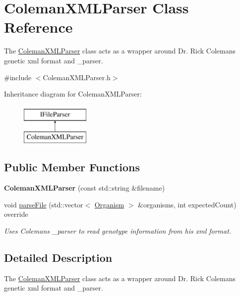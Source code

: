 \hypertarget{class_coleman_x_m_l_parser}{}\section{Coleman\+X\+M\+L\+Parser Class Reference}
\label{class_coleman_x_m_l_parser}


The \hyperlink{class_coleman_x_m_l_parser}{Coleman\+X\+M\+L\+Parser} class acts as a wrapper around Dr. Rick Coleman\textquotesingle{}s genetic xml format and \+\_\+parser.  




{\ttfamily \#include $<$Coleman\+X\+M\+L\+Parser.\+h$>$}

Inheritance diagram for Coleman\+X\+M\+L\+Parser\+:\begin{figure}[H]
\begin{center}
\leavevmode
\includegraphics[height=2.000000cm]{class_coleman_x_m_l_parser}
\end{center}
\end{figure}
\subsection*{Public Member Functions}
\begin{DoxyCompactItemize}
\item 
{\bfseries Coleman\+X\+M\+L\+Parser} (const std\+::string \&filename)\hypertarget{class_coleman_x_m_l_parser_a3daa7719b45ab65f0b022c869055f104}{}\label{class_coleman_x_m_l_parser_a3daa7719b45ab65f0b022c869055f104}

\item 
void \hyperlink{class_coleman_x_m_l_parser_a8f2949b991e5922734277a56f81c9a77}{parse\+File} (std\+::vector$<$ \hyperlink{class_organism}{Organism} $>$ \&organisms, int expected\+Count) override
\begin{DoxyCompactList}\small\item\em Uses Coleman\textquotesingle{}s \+\_\+parser to read genotype information from his xml format. \end{DoxyCompactList}\end{DoxyCompactItemize}


\subsection{Detailed Description}
The \hyperlink{class_coleman_x_m_l_parser}{Coleman\+X\+M\+L\+Parser} class acts as a wrapper around Dr. Rick Coleman\textquotesingle{}s genetic xml format and \+\_\+parser. 

